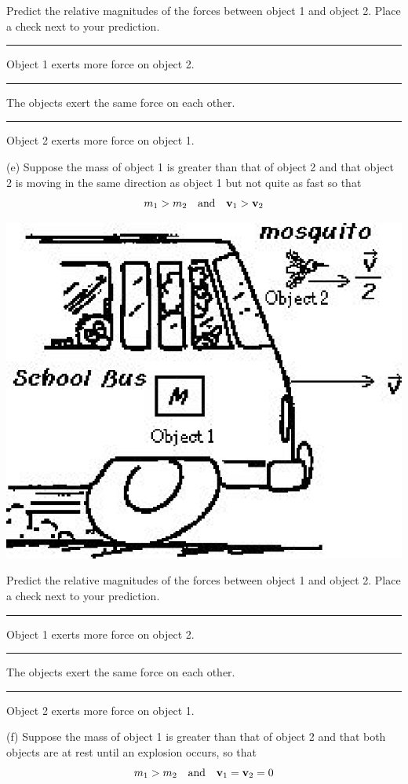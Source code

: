 Predict the relative magnitudes of the forces between object 1 and object 2.
Place a check next to your prediction. 

\rule{0.5in}{0.1pt} Object 1 exerts more force on object 2. 

\rule{0.5in}{0.1pt} The objects exert the same force on each other.

\rule{0.5in}{0.1pt} Object 2 exerts more force on object 1.

(e) Suppose the mass of object 1 is greater than that of object 2 and that object
2 is moving in the same direction as object 1 but not quite as fast so that
\[
m_{1}>m_{2}\quad \mbox{and}\quad {{\bf v}_{1}}>{{\bf v}_{2}}\]


\vspace{0.3cm}
{\par\centering \includegraphics{newtons_laws/newtons_laws_fig5.eps} \par}
\vspace{0.3cm}

Predict the relative magnitudes of the forces between object 1 and object 2.
Place a check next to your prediction. 

\rule{0.5in}{0.1pt} Object 1 exerts more force on object 2. 

\rule{0.5in}{0.1pt} The objects exert the same force on each other. 

\rule{0.5in}{0.1pt} Object 2 exerts more force on object 1.

(f) Suppose the mass of object 1 is greater than that of object 2 and that both
objects are at rest until an explosion occurs, so that
\[
m_{1}>m_{2}\quad \mbox{and}\quad {{\bf v}_{1}}={{\bf v}_{2}}=0\]


